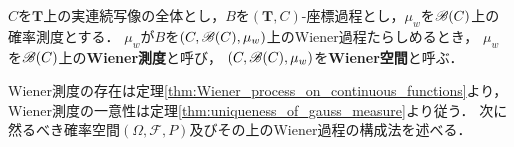	\begin{screen}
		\begin{dfn}[Wiener測度]
			$C$を$\mathbf{T}$上の実連続写像の全体とし，$B$を$(\mathbf{T},C)$-座標過程とし，$\mu_w$を$\mathscr{B}(C)$上の確率測度とする．
			$\mu_w$が$B$を$(C,\mathscr{B}(C),\mu_w)$上のWiener過程たらしめるとき，
			$\mu_w$を$\mathscr{B}(C)$上の{\bf Wiener測度}と呼び，
			$(C,\mathscr{B}(C),\mu_w)$を{\bf Wiener空間}と呼ぶ．
		\end{dfn}
	\end{screen}
	
	Wiener測度の存在は定理\ref{thm:Wiener_process_on_continuous_functions}より，
	Wiener測度の一意性は定理\ref{thm:uniqueness_of_gauss_measure}より従う．
	次に然るべき確率空間$(\Omega,\mathscr{F},P)$及びその上のWiener過程の構成法を述べる．